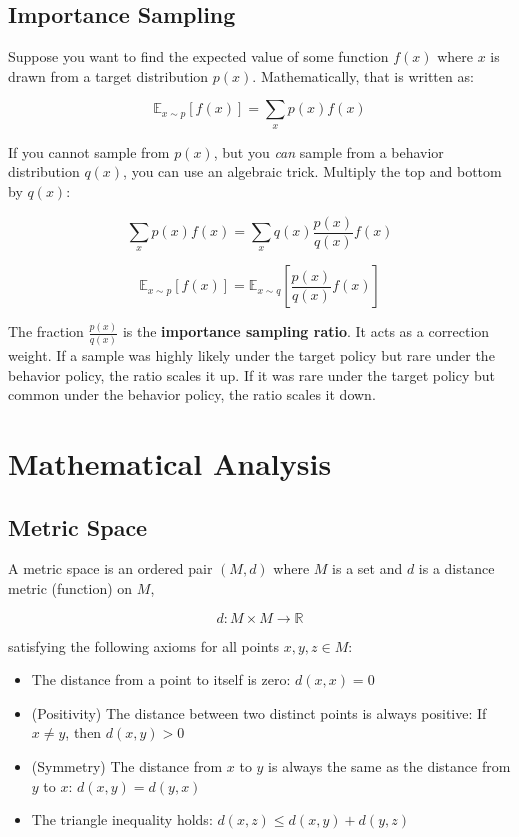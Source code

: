 \documentclass{article}
\begin{document}
\subsection{Importance Sampling}

Suppose you want to find the expected value of some function $f(x)$ where $x$ is drawn from a target distribution $p(x)$. Mathematically, that is written as:

\[\mathbb{E}_{x \sim p}[f(x)] = \sum_{x} p(x) f(x)\]

If you cannot sample from $p(x)$, but you \textit{can} sample from a behavior distribution $q(x)$, you can use an algebraic trick. Multiply the top and bottom by $q(x)$:

\[\sum_{x} p(x) f(x) = \sum_{x} q(x) \frac{p(x)}{q(x)} f(x)\]

\[\mathbb{E}_{x \sim p}[f(x)] = \mathbb{E}_{x \sim q}\left[ \frac{p(x)}{q(x)} f(x) \right]\]

The fraction $\frac{p(x)}{q(x)}$ is the \textbf{importance sampling ratio}. It acts as a correction weight. If a sample was highly likely under the target policy but rare under the behavior policy, the ratio scales it up. If it was rare under the target policy but common under the behavior policy, the ratio scales it down.

\section{Mathematical Analysis}

\subsection{Metric Space}

A metric space is an ordered pair \((M, d)\) where \(M\) is a set and \(d\) is a distance metric (function) on \(M\),

\[d: M \times M \rightarrow \mathbb{R}\]

satisfying the following axioms for all points \(x, y, z \in M\):

\begin{itemize}
    \item The distance from a point to itself is zero: \(d(x, x) = 0\)
    \item (Positivity) The distance between two distinct points is always positive: If \(x \neq y\), then \(d(x,y) > 0\)
    \item (Symmetry) The distance from \(x\) to \(y\) is always the same as the distance from \(y\) to \(x\): \(d(x,y) = d(y,x)\)
    \item The triangle inequality holds: \(d(x, z) \leq  d(x, y) + d(y, z)\)
\end{itemize}
\end{document}
